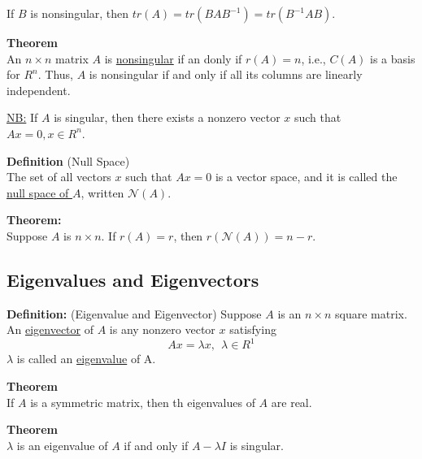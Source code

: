 \documentclass[12pt]{article}
\numberwithin{equation}{section}
\begin{document}
If $B$ is nonsingular, then $tr(A) = tr(B A B^{-1}) = tr(B^{-1} A B)$.

\textbf{Theorem} \\
An $n \times n$ matrix $A$ is \underline{nonsingular} if an donly if $r(A) = n$, i.e., $C(A)$ is a basis for $R^n$. Thus, $A$ is nonsingular if and only if all its columns are linearly independent.

\underline{NB:} If $A$ is singular, then there exists a nonzero vector $x$ such that $Ax = 0, x \in R^n$. 

\textbf{Definition} (Null Space) \\
The set of all vectors $x$ such that $Ax = 0$ is a vector space, and it is called the \underline{null space of $A$}, written $\mathcal{N}(A)$.

\textbf{Theorem:} \\
Suppose $A$ is $n \times n$. If $r(A) = r$, then $r(\mathcal{N}(A)) = n - r$.

\subsection{Eigenvalues and Eigenvectors}
\textbf{Definition:} (Eigenvalue and Eigenvector)
Suppose $A$ is an $n \times n$ square matrix. An \underline{eigenvector} of $A$ is any nonzero vector $x$ satisfying
\begin{equation*}
  Ax = \lambda x, \ \ \lambda \in R^1
\end{equation*}
$\lambda$ is called an \underline{eigenvalue} of A.

\textbf{Theorem} \\
If $A$ is a symmetric matrix, then th eigenvalues of $A$ are real.

\textbf{Theorem} \\
$\lambda$ is an eigenvalue of $A$ if and only if $A - \lambda I$ is singular.
\end{document}
